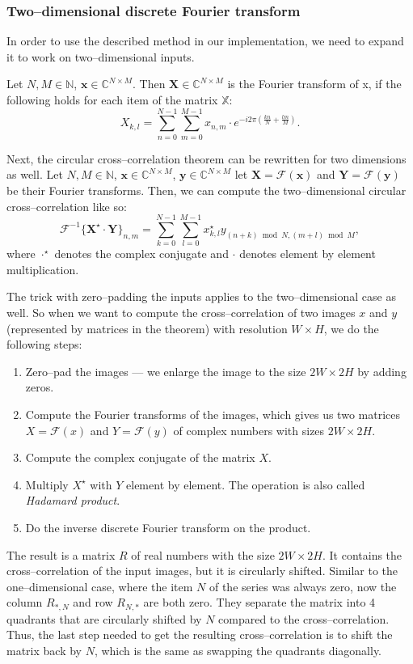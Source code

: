\subsubsection{Two--dimensional discrete Fourier transform}

In order to use the described method in our implementation, we need to expand it to work on two--dimensional inputs.

Let $N, M \in \mathbb{N}$, $\mathbf{x} \in \mathbb{C}^{N\times M}$. Then $\mathbf{X} \in \mathbb{C}^{N\times M}$ is the Fourier transform of x, if the following holds for each item of the matrix $\mathbb{X}$:
\[
X_{k,l} = \sum_{n=0}^{N-1} \sum_{m=0}^{M-1} x_{n,m} \cdot e^{-i2\pi(\frac{kn}{N} + \frac{lm}{M})}.
\]

Next, the circular cross--correlation theorem can be rewritten for two dimensions as well. Let $N, M \in \mathbb{N}$, $\mathbf{x} \in \mathbb{C}^{N\times M}$, $\mathbf{y} \in \mathbb{C}^{N\times M}$ let $\mathbf{X} = \mathcal{F}(\mathbf{x})$ and $\mathbf{Y} = \mathcal{F}(\mathbf{y})$ be their Fourier transforms. Then, we can compute the two--dimensional circular cross--correlation like so: 
\[
\mathcal{F}^{-1}\{\mathbf{X}^\star \cdot \mathbf{Y}\}_{n,m} = \sum_{k=0}^{N-1} \sum_{l=0}^{M-1} x^\star_{k,l} y_{(n+k)\bmod N, (m+l)\bmod M},
\]
where $\cdot^\star$ denotes the complex conjugate and $\cdot$ denotes element by element multiplication.

The trick with zero--padding the inputs applies to the two--dimensional case as well. So when we want to compute the cross--correlation of two images $x$ and $y$ (represented by matrices in the theorem) with resolution $W \times H$, we do the following steps:
\begin{enumerate}
	\item Zero--pad the images --- we enlarge the image to the size $2W \times 2H$ by adding zeros.
	\item Compute the Fourier transforms of the images, which gives us two matrices $X = \mathcal{F}(x)$ and $Y =\mathcal{F}(y)$ of complex numbers with sizes $2W \times 2H$.
	\item Compute the complex conjugate of the matrix $X$.
	\item Multiply $X^\star$ with $Y$ element by element. The operation is also called \emph{Hadamard product}.
	\item Do the inverse discrete Fourier transform on the product.
\end{enumerate}
The result is a matrix $R$ of real numbers with the size $2W \times 2H$. It contains the cross--correlation of the input images, but it is circularly shifted. Similar to the one--dimensional case, where the item $N$ of the series was always zero, now the column $R_{*,N}$ and row $R_{N,*}$ are both zero. They separate the matrix into 4 quadrants that are circularly shifted by $N$ compared to the cross--correlation. Thus, the last step needed to get the resulting cross--correlation is to shift the matrix back by $N$, which is the same as swapping the quadrants diagonally.

